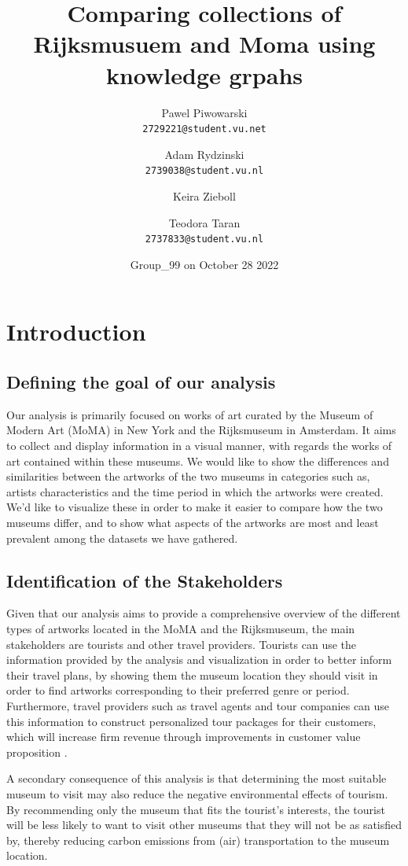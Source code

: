 \documentclass{article}
\title{Comparing collections of Rijksmusuem and Moma using knowledge grpahs}
\author{
  Pawel Piwowarski\\
  \texttt{2729221@student.vu.net}
  \and
  Adam Rydzinski\\
  \texttt{2739038@student.vu.nl}
  \and
  Keira Zieboll\\
  \texttt{}
   \and
  Teodora Taran\\
  \texttt{2737833@student.vu.nl}
}
\date{Group\_99 on October 28 2022}
\begin{document}
\maketitle


\section{Introduction}
\subsection{Defining the goal of our analysis}

Our analysis is primarily focused on works of art curated by the Museum of Modern Art (MoMA) in New York and the Rijksmuseum in Amsterdam. It aims to collect and display information in a visual manner, with regards the works of art contained within these museums. We would like to show the differences and similarities between the artworks of the two museums in categories such as, artists characteristics and the time period in which the artworks were created. We’d like to visualize these in order to make it easier to compare how the two museums differ, and to show what aspects of the artworks are most and least prevalent among the datasets we have gathered.


\subsection{Identification of the Stakeholders}

Given that our analysis aims to provide a comprehensive overview of the different types of artworks located in the MoMA and the Rijksmuseum, the main stakeholders are tourists and other travel providers. Tourists can use the information provided by the analysis and visualization in order to better inform their travel plans, by showing them the museum location they should visit in order to find artworks corresponding to their preferred genre or period. Furthermore, travel providers such as travel agents and tour companies can use this information to construct personalized tour packages for their customers, which will increase firm revenue through improvements in customer value proposition \cite{keira}.

A secondary consequence of this analysis is that determining the most suitable museum to visit may also reduce the negative environmental effects of tourism. By recommending only the museum that fits the tourist’s interests, the tourist will be less likely to want to visit other museums that they will not be as satisfied by, thereby reducing carbon emissions from (air) transportation to the museum location.
\end{document}
